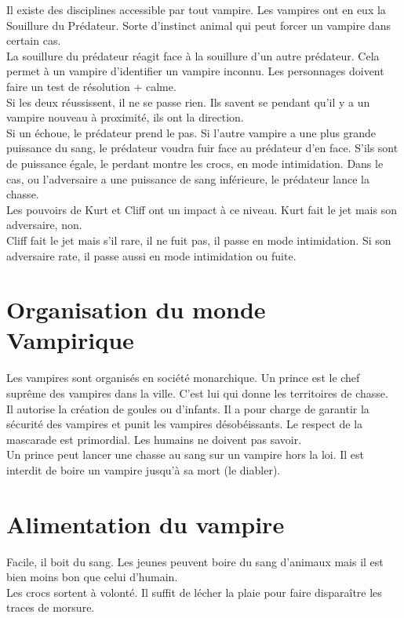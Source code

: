 \documentclass[oneside,12pt]{book}
\begin{document}
\begin{flushleft}
Il existe des disciplines accessible par tout vampire.
Les vampires ont en eux la Souillure du Prédateur. Sorte d'instinct animal qui peut forcer un vampire dans certain cas.\\ 
\vspace{0.5cm}
La souillure du prédateur réagit face à la souillure d'un autre prédateur. Cela permet à un vampire d'identifier un vampire inconnu. 
Les personnages doivent faire un test de résolution + calme.\\ 
\vspace{0.5cm}
Si les deux réussissent, il ne se passe rien. Ils savent se pendant qu'il y a un vampire nouveau à proximité, ils ont la direction. \\ 
\vspace{0.5cm}
Si un échoue, le prédateur prend le pas. Si l'autre vampire a une plus grande puissance du sang, le prédateur 
voudra fuir face au prédateur d'en face. S'ils sont de puissance égale, le perdant montre les crocs, en mode intimidation. Dans le cas, ou l'adversaire a une puissance de sang inférieure, le prédateur lance la chasse.\\ 
\vspace{0.5cm}
Les pouvoirs de Kurt et Cliff ont un impact à ce niveau. 
Kurt fait le jet mais son adversaire, non. \\
Cliff fait le jet mais s'il rare, il ne fuit pas, il passe en mode intimidation. Si son adversaire rate, il passe aussi en mode intimidation ou fuite.


\section{Organisation du monde Vampirique}
Les vampires sont organisés en société monarchique. 
Un prince est le chef suprême des vampires dans la ville. C'est lui qui donne les territoires de chasse. \\
Il autorise la création de goules ou d'infants. Il a pour charge de garantir la sécurité des vampires et punit les vampires désobéissants. Le respect de la mascarade est primordial. Les humains ne doivent pas savoir. \\
Un prince peut lancer une chasse au sang sur un vampire hors la loi.
Il est interdit de boire un vampire jusqu'à sa mort (le diabler).


\section{Alimentation du vampire}
Facile, il boit du sang. Les jeunes peuvent boire du sang d'animaux mais il est bien moins bon que celui d'humain. \\
Les crocs sortent à volonté. Il suffit de lécher la plaie pour faire disparaître les traces de morsure. 



\end{flushleft}
\end{document}
